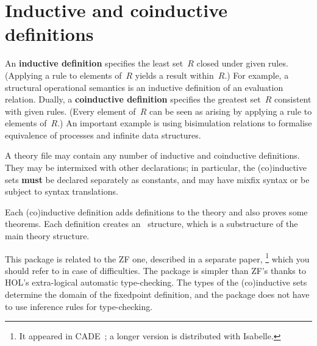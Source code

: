 

\section{Inductive and coinductive definitions}

An {\bf inductive definition} specifies the least set~$R$ closed under given
rules.  (Applying a rule to elements of~$R$ yields a result within~$R$.)  For
example, a structural operational semantics is an inductive definition of an
evaluation relation.  Dually, a {\bf coinductive definition} specifies the
greatest set~$R$ consistent with given rules.  (Every element of~$R$ can be
seen as arising by applying a rule to elements of~$R$.)  An important example
is using bisimulation relations to formalise equivalence of processes and
infinite data structures.

A theory file may contain any number of inductive and coinductive
definitions.  They may be intermixed with other declarations; in
particular, the (co)inductive sets {\bf must} be declared separately as
constants, and may have mixfix syntax or be subject to syntax translations.

Each (co)inductive definition adds definitions to the theory and also
proves some theorems.  Each definition creates an \ML\ structure, which is a
substructure of the main theory structure.

This package is related to the ZF one, described in a separate
paper,%
\footnote{It appeared in CADE~\cite{paulson-CADE}; a longer version is
  distributed with Isabelle.}  %
which you should refer to in case of difficulties.  The package is simpler
than ZF's thanks to HOL's extra-logical automatic type-checking.  The types of
the (co)inductive sets determine the domain of the fixedpoint definition, and
the package does not have to use inference rules for type-checking.


